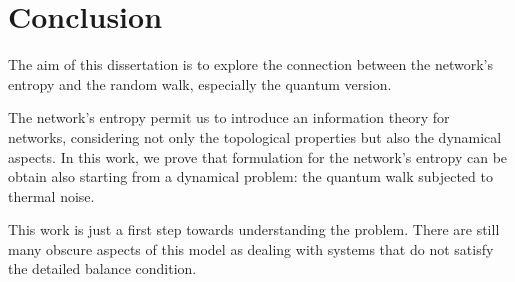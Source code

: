 \chapter*{Conclusion}

The aim of this dissertation is to explore the connection between the network's entropy and the random walk, especially the quantum version.

The network's entropy permit us to introduce an information theory for networks, considering not only the topological properties but also the dynamical aspects. 
In this work, we prove that formulation for the network's entropy can be obtain also starting from a dynamical problem: the quantum walk subjected to thermal noise.



This work is just a first step towards understanding the problem. There are still many obscure aspects of this model as dealing with systems that do not satisfy the detailed balance condition. 